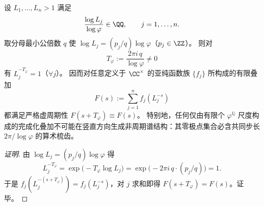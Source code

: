 \begin{conclusion}\label{con:xi-terminal-phi-q-scale-mix-common-imag-period}
设 \(L_1,\dots,L_n>1\) 满足
\[
\frac{\log L_j}{\log\varphi}\in\QQ,\qquad j=1,\dots,n.
\]
取分母最小公倍数 \(q\) 使 \(\log L_j=(p_j/q)\log\varphi\)（\(p_j\in\ZZ\)）。
则对
\[
T_{\varphi}:=\frac{2\pi i\,q}{\log\varphi}\neq 0
\]
有 \(L_j^{-T_{\varphi}}=1\)（\(\forall j\)）。
因而对任意定义于 \(\CC^{\times}\) 的亚纯函数族 \(\{f_j\}\) 所构成的有限叠加
\[
F(s):=\sum_{j=1}^{n} f_j(L_j^{-s})
\]
都满足严格虚周期性 \(F(s+T_{\varphi})\equiv F(s)\)。
特别地，任何仅由有限个 \(\varphi^{\mathbb Q}\) 尺度构成的完成化叠加不可能在竖直方向生成非周期谱结构：其零极点集合必含共同步长 \(2\pi/\log\varphi\) 的算术梳齿。
\end{conclusion}
\begin{proof}[证明]
由 \(\log L_j=(p_j/q)\log\varphi\) 得
\[
L_j^{-T_{\varphi}}=\exp\!\bigl(-T_{\varphi}\log L_j\bigr)
=\exp\!\bigl(-2\pi i\,q\cdot (p_j/q)\bigr)=1.
\]
于是 \(f_j(L_j^{-(s+T_{\varphi})})=f_j(L_j^{-s})\)，对 \(j\) 求和即得 \(F(s+T_{\varphi})=F(s)\)。证毕。
\end{proof}
